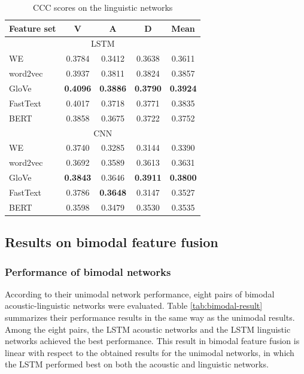 \begin{table}[htpb]
  \caption{CCC scores on the linguistic networks}
  \begin{center}
 \label{tab:text-result}
 \begin{tabular}{l c c c c}
 \hline
Feature set & V & A & D & Mean \\
\hline \hline
\multicolumn{5}{c}{LSTM} \\ 
WE       & 0.3784  & 0.3412 & 0.3638 & 0.3611 \\
word2vec & 0.3937  & 0.3811  & 0.3824  & 0.3857 \\
GloVe    & \textbf{0.4096} & \textbf{0.3886} & \textbf{0.3790} &
\textbf{0.3924} \\
FastText & 0.4017 & 0.3718 & 0.3771 & 0.3835 \\
BERT     & 0.3858  & 0.3675  & 0.3722  & 0.3752 \\
 \hline
\multicolumn{5}{c}{CNN} \\
WE       & 0.3740 & 0.3285 & 0.3144 & 0.3390 \\
word2vec & 0.3692  & 0.3589  & 0.3613  & 0.3631 \\
GloVe    & \textbf{0.3843} & 0.3646 & \textbf{0.3911} & \textbf{0.3800} \\
FastText & 0.3786 & \textbf{0.3648} & 0.3147 & 0.3527 \\
BERT     & 0.3598  & 0.3479  & 0.3530  & 0.3535 \\
 \hline
 \end{tabular}
\end{center}
\end{table} 

\subsection{Results on bimodal feature fusion}
\subsubsection{Performance of bimodal networks}
According to their unimodal network performance, eight pairs of bimodal
acoustic-linguistic networks were evaluated. Table \ref{tab:bimodal-result}
summarizes their performance results in the same way as the unimodal
results.  Among the eight pairs, the LSTM acoustic networks and the LSTM
linguistic networks achieved the best performance. This result in bimodal
feature fusion is linear with respect to the obtained results for the unimodal
networks, in which the LSTM performed best on both the acoustic and linguistic
networks. 

